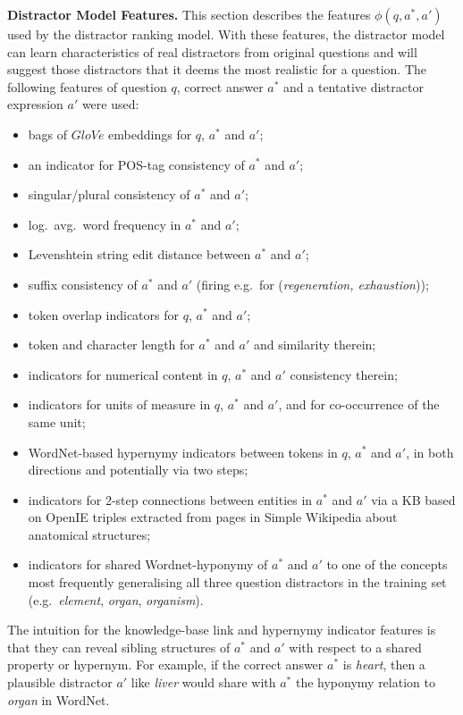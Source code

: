 \textbf{Distractor Model Features.} This section describes the features $\phi(q,a^*,a')$ used by the distractor ranking model. With these features, the distractor model can learn characteristics of real distractors from original questions and will suggest those distractors that it deems the most realistic for a question. The following features of question $q$, correct answer $a^*$ and a tentative distractor expression $a'$ were used:

\begin{itemize}
\item  bags of $GloVe$ embeddings for $q$, $a^*$ and $a'$; 
\item  an indicator for POS-tag consistency of $a^*$ and $a'$;
\item  singular/plural consistency of $a^*$ and $a'$;
\item  log.~avg.~word frequency in $a^*$ and $a'$;
\item  Levenshtein string edit distance between $a^*$ and $a'$; 
\item  suffix consistency of $a^*$ and $a'$ (firing e.g.~for (\emph{regeneration, exhaustion})); 
\item  token overlap indicators for $q$, $a^*$ and $a'$;    
\item  token and character length for $a^*$ and $a'$ and similarity therein;  
\item  indicators for numerical content in $q$, $a^*$ and $a'$ consistency therein;
\item  indicators for units of measure in $q$, $a^*$ and $a'$, and for co-occurrence of the same unit; 
\item  WordNet-based hypernymy indicators between tokens in $q$, $a^*$ and $a'$, in both directions and potentially via two steps; 
\item  indicators for 2-step connections between entities in $a^*$ and $a'$ via a KB based on OpenIE triples \cite{Mausam2012OpenIE} extracted from pages in Simple Wikipedia about anatomical structures;
\item  indicators for shared Wordnet-hyponymy of $a^*$ and $a'$ to one of the concepts most frequently generalising all three question distractors in the training set (e.g.~\emph{element}, \emph{organ}, \emph{organism}). 
\end{itemize}

The intuition for the knowledge-base link and hypernymy indicator features is that they can reveal sibling structures of $a^*$ and $a'$ with respect to a shared property or hypernym. For example, if the correct answer $a^*$ is \emph{heart}, then a plausible distractor $a'$ like \emph{liver} would share with $a^*$ the hyponymy relation to \emph{organ} in WordNet.

